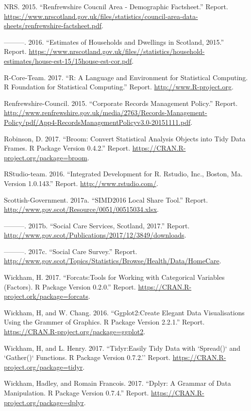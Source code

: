 \documentclass[]{article}
\begin{document}
\hypertarget{ref-RN492}{}
NRS. 2015. ``Renfrewshire Coucnil Area - Demographic Factsheet.''
Report.
\url{https://www.nrscotland.gov.uk/files/statistics/council-area-data-sheets/renfrewshire-factsheet.pdf}.

\hypertarget{ref-RN493}{}
---------. 2016. ``Estimates of Households and Dwellings in Scotland,
2015.'' Report.
\url{https://www.nrscotland.gov.uk/files//statistics/household-estimates/house-est-15/15house-est-cor.pdf}.

\hypertarget{ref-RN295}{}
R-Core-Team. 2017. ``R: A Language and Environment for Statistical
Computing. R Foundation for Statistical Computing.'' Report.
\url{http://www.R-project.org}.

\hypertarget{ref-RN495}{}
Renfrewshire-Council. 2015. ``Corporate Records Management Policy.''
Report.
\url{http://www.renfrewshire.gov.uk/media/2763/Records-Management-Policy/pdf/App4-RecordsManagementPolicyv3.0-20151111.pdf}.

\hypertarget{ref-RN520}{}
Robinson, D. 2017. ``Broom: Convert Statistical Analysis Objects into
Tidy Data Frames. R Package Version 0.4.2.'' Report.
\url{https://CRAN.R-project.org/package=broom}.

\hypertarget{ref-RN498}{}
RStudio-team. 2016. ``Integrated Development for R. Rstudio, Inc.,
Boston, Ma. Version 1.0.143.'' Report.
\href{\%20http://www.rstudio.com/}{http://www.rstudio.com/}.

\hypertarget{ref-RN494}{}
Scottish-Government. 2017a. ``SIMD2016 Local Share Tool.'' Report.
\url{http://www.gov.scot/Resource/0051/00515034.xlsx}.

\hypertarget{ref-RN499}{}
---------. 2017b. ``Social Care Services, Scotland, 2017.'' Report.
\url{http://www.gov.scot/Publications/2017/12/3849/downloads}.

\hypertarget{ref-RN487}{}
---------. 2017c. ``Social Care Survey.'' Report.
\url{http://www.gov.scot/Topics/Statistics/Browse/Health/Data/HomeCare}.

\hypertarget{ref-RN521}{}
Wickham, H. 2017. ``Forcats:Tools for Working with Categorical Variables
(Factors). R Package Version 0.2.0.'' Report.
\url{https://CRAN.R-project.ork/package=forcats}.

\hypertarget{ref-RN525}{}
Wickham, H, and W. Chang. 2016. ``Ggplot2:Create Elegant Data
Visualisations Using the Grammer of Graphics. R Package Version 2.2.1.''
Report. \url{https://CRAN.R-project.org/package=ggplot2}.

\hypertarget{ref-RN524}{}
Wickham, H, and L. Henry. 2017. ``Tidyr:Easily Tidy Data with `Spread()`
and `Gather()` Functions. R Package Version 0.7.2.'' Report.
\url{https://CRAN.R-project.org/package=tidyr}.

\hypertarget{ref-RN283}{}
Wickham, Hadley, and Romain Francois. 2017. ``Dplyr: A Grammar of Data
Manipulation. R Package Version 0.7.4.'' Report.
\url{https://CRAN.R-project.org/package=dplyr}.
\end{document}
